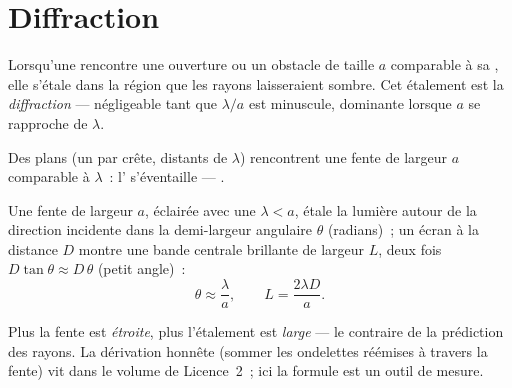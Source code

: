 \section{Diffraction}

\begin{definition}[Diffraction]\label{def:g12:light-as-wave:diffraction}
Lorsqu'une  rencontre une ouverture ou un obstacle de taille
$a$ comparable à sa , elle s'étale dans la
région que les rayons laisseraient sombre. Cet étalement est la
\emph{diffraction} --- négligeable tant que
$\lambda/a$ est minuscule, dominante lorsque $a$ se rapproche de
$\lambda$.
\end{definition}

\begin{omfigure}

{\small Des  plans (un par crête, distants de
$\lambda$) rencontrent une fente de largeur $a$ comparable à
$\lambda$~: l' s'éventaille --- .}
\end{omfigure}

\begin{proposition}\label{prop:g12:light-as-wave:halfwidth}
Une fente de largeur $a$, éclairée avec une 
$\lambda < a$, étale la lumière autour de la direction incidente dans
la demi-largeur angulaire $\theta$ (radians)~; un écran à la distance
$D$ montre une bande centrale brillante de largeur $L$, deux fois
$D \tan\theta \approx D\,\theta$ (petit angle)~:
\[
\theta \approx \frac{\lambda}{a}, \qquad L = \frac{2\lambda D}{a}.
\]
\end{proposition}
\admitted

\begin{remark}\label{rem:g12:light-as-wave:honest}
Plus la fente est \emph{étroite}, plus l'étalement est \emph{large}
--- le contraire de la prédiction des rayons. La dérivation honnête
(sommer les ondelettes réémises à travers la fente) vit dans le volume
de Licence~2~; ici la formule est un outil de mesure.
\end{remark}

